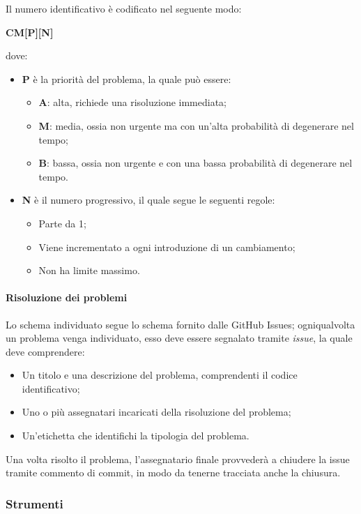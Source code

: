 \documentclass[../norme-di-progetto.tex]{subfiles}
\begin{document}
Il numero identificativo è codificato nel seguente modo: \\
\begin{center}
  \centering
  \textbf{CM[P][N]}
\end{center} dove:
\begin{itemize}
  \item \textbf{P} è la priorità del problema, la quale può essere:
  \begin{itemize}
    \item \textbf{A}: alta, richiede una risoluzione immediata;
    \item \textbf{M}: media, ossia non urgente ma con un'alta probabilità di degenerare nel tempo;
    \item \textbf{B}: bassa, ossia non urgente e con una bassa probabilità di degenerare nel tempo.
  \end{itemize}
  \item \textbf{N} è il numero progressivo, il quale segue le seguenti regole:
  \begin{itemize}
    \item Parte da 1;
    \item Viene incrementato a ogni introduzione di un cambiamento;
    \item Non ha limite massimo.
  \end{itemize}
\end{itemize}

\paragraph{Risoluzione dei problemi}
Lo schema individuato segue lo schema fornito dalle GitHub Issues; ogniqualvolta un problema venga individuato, esso deve essere segnalato tramite \textit{issue}, la quale deve comprendere:
\begin{itemize}
  \item Un titolo e una descrizione del problema, comprendenti il codice identificativo;
  \item Uno o più assegnatari incaricati della risoluzione del problema;
  \item Un'etichetta che identifichi la tipologia del problema.
\end{itemize}
Una volta risolto il problema, l'assegnatario finale provvederà a chiudere la issue tramite commento di commit, in modo da tenerne tracciata anche la chiusura.

\subsubsection{Strumenti}
\end{document}
